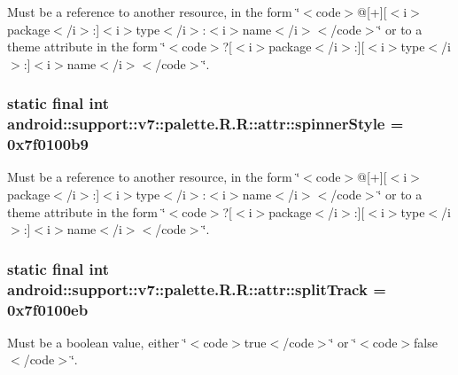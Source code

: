 Must be a reference to another resource, in the form \char`\"{}$<$code$>$@\mbox{[}+\mbox{]}\mbox{[}$<$i$>$package$<$/i$>$:\mbox{]}$<$i$>$type$<$/i$>$:$<$i$>$name$<$/i$>$$<$/code$>$\char`\"{} or to a theme attribute in the form \char`\"{}$<$code$>$?\mbox{[}$<$i$>$package$<$/i$>$:\mbox{]}\mbox{[}$<$i$>$type$<$/i$>$:\mbox{]}$<$i$>$name$<$/i$>$$<$/code$>$\char`\"{}. \hypertarget{classandroid_1_1support_1_1v7_1_1palette_1_1_r_1_1attr_0ca966df0c89098562286878d907f4db}{
\subsubsection[{spinnerStyle}]{\setlength{\rightskip}{0pt plus 5cm}static final int android::support::v7::palette.R.R::attr::spinnerStyle = 0x7f0100b9}}
\label{classandroid_1_1support_1_1v7_1_1palette_1_1_r_1_1attr_0ca966df0c89098562286878d907f4db}


Must be a reference to another resource, in the form \char`\"{}$<$code$>$@\mbox{[}+\mbox{]}\mbox{[}$<$i$>$package$<$/i$>$:\mbox{]}$<$i$>$type$<$/i$>$:$<$i$>$name$<$/i$>$$<$/code$>$\char`\"{} or to a theme attribute in the form \char`\"{}$<$code$>$?\mbox{[}$<$i$>$package$<$/i$>$:\mbox{]}\mbox{[}$<$i$>$type$<$/i$>$:\mbox{]}$<$i$>$name$<$/i$>$$<$/code$>$\char`\"{}. \hypertarget{classandroid_1_1support_1_1v7_1_1palette_1_1_r_1_1attr_1d88158106a3a5d9f00ea0e9121464f6}{
\subsubsection[{splitTrack}]{\setlength{\rightskip}{0pt plus 5cm}static final int android::support::v7::palette.R.R::attr::splitTrack = 0x7f0100eb}}
\label{classandroid_1_1support_1_1v7_1_1palette_1_1_r_1_1attr_1d88158106a3a5d9f00ea0e9121464f6}


Must be a boolean value, either \char`\"{}$<$code$>$true$<$/code$>$\char`\"{} or \char`\"{}$<$code$>$false$<$/code$>$\char`\"{}. 

